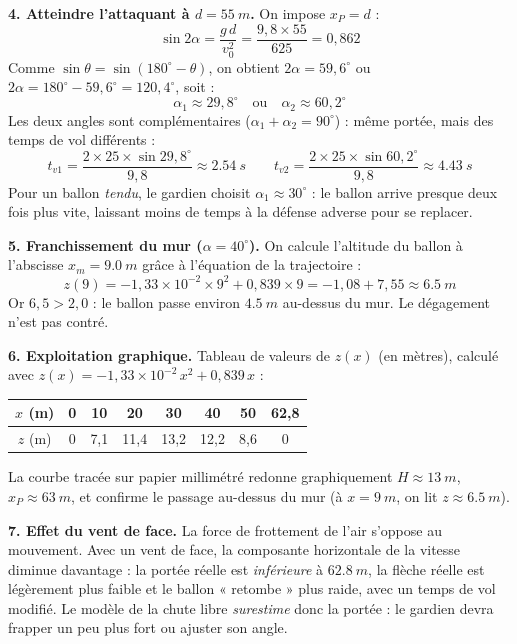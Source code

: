 \documentclass[11pt]{article}
\newcommand{\cle}[1]{{\popxbold\color{popdark}#1}}
\begin{document}
\begin{exoresolu}
\textbf{4. Atteindre l'attaquant à $d = \SI{55}{m}$.} On impose $x_P = d$ :
\[ \sin 2\alpha = \dfrac{g\,d}{v_0^2} = \dfrac{9{,}8\times 55}{625} = 0{,}862 \]
Comme $\sin\theta = \sin(180^{\circ}-\theta)$, on obtient $2\alpha = 59{,}6^{\circ}$ ou $2\alpha = 180^{\circ} - 59{,}6^{\circ} = 120{,}4^{\circ}$, soit :
\[ \alpha_1 \approx 29{,}8^{\circ} \quad \text{ou} \quad \alpha_2 \approx 60{,}2^{\circ} \]
Les deux angles sont \cle{complémentaires} ($\alpha_1 + \alpha_2 = 90^{\circ}$) : même portée, mais des temps de vol différents :
\[ t_{v1} = \dfrac{2\times 25\times\sin 29{,}8^{\circ}}{9{,}8} \approx \SI{2,54}{s} \qquad t_{v2} = \dfrac{2\times 25\times\sin 60{,}2^{\circ}}{9{,}8} \approx \SI{4,43}{s} \]
Pour un ballon \emph{tendu}, le gardien choisit $\alpha_1 \approx 30^{\circ}$ : le ballon arrive presque deux fois plus vite, laissant moins de temps à la défense adverse pour se replacer.

\textbf{5. Franchissement du mur ($\alpha = 40^{\circ}$).} On calcule l'altitude du ballon à l'abscisse $x_m = \SI{9,0}{m}$ grâce à l'équation de la trajectoire :
\[ z(9) = -1{,}33\times 10^{-2}\times 9^2 + 0{,}839\times 9 = -1{,}08 + 7{,}55 \approx \SI{6,5}{m} \]
Or $6{,}5 > 2{,}0$ : le ballon passe environ $\SI{4,5}{m}$ au-dessus du mur. Le dégagement n'est pas contré.

\textbf{6. Exploitation graphique.} Tableau de valeurs de $z(x)$ (en mètres), calculé avec $z(x) = -1{,}33\times 10^{-2}\,x^2 + 0{,}839\,x$ :

\begin{center}
\begin{tabular}{|c|*{7}{c|}}\hline
\rowcolor{popblueL}
$x$ (m) & 0 & 10 & 20 & 30 & 40 & 50 & 62,8 \\ \hline
$z$ (m) & 0 & 7,1 & 11,4 & 13,2 & 12,2 & 8,6 & 0 \\ \hline
\end{tabular}
\end{center}

La courbe tracée sur papier millimétré redonne graphiquement $H \approx \SI{13}{m}$, $x_P \approx \SI{63}{m}$, et confirme le passage au-dessus du mur (à $x = \SI{9}{m}$, on lit $z \approx \SI{6,5}{m}$).

\textbf{7. Effet du vent de face.} La force de frottement de l'air s'oppose au mouvement. Avec un vent de face, la composante horizontale de la vitesse diminue davantage : la \cle{portée réelle} est \emph{inférieure} à $\SI{62,8}{m}$, la flèche réelle est légèrement plus faible et le ballon « retombe » plus raide, avec un temps de vol modifié. Le modèle de la chute libre \emph{surestime} donc la portée : le gardien devra frapper un peu plus fort ou ajuster son angle.


\end{exoresolu}
\end{document}
